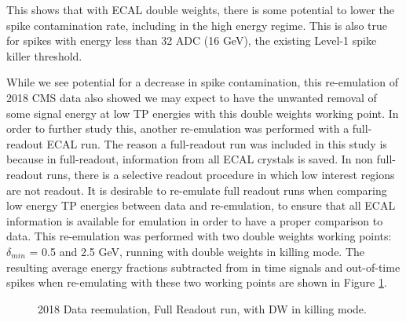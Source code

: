 This shows that with ECAL double weights, there is some potential to lower the spike contamination rate, including in the high energy regime. This is also true for spikes with energy less than 32 ADC (16 GeV), the existing Level-1 spike killer threshold. 

While we see potential for a decrease in spike contamination, this re-emulation of 2018 CMS data also showed we may expect to have the unwanted removal of some signal energy at low TP energies with this double weights working point. In order to further study this, another re-emulation was performed with a full-readout ECAL run. The reason a full-readout run was included in this study is because in full-readout, information from all ECAL crystals is saved. In non full-readout runs, there is a selective readout procedure in which low interest regions are not readout. It is desirable to re-emulate full readout runs when comparing low energy TP energies between data and re-emulation, to ensure that all ECAL information is available for emulation in order to have a proper comparison to data. This re-emulation was performed with two double weights working points: $\delta_{min}$ = 0.5 and 2.5 GeV, running with double weights in killing mode. The resulting average energy fractions subtracted from in time signals and out-of-time spikes when re-emulating with these two working points are shown in Figure \ref{fig:2018Reemulation_FR_KillingMode_deltamincompare}. 

\begin{figure}[H]%
    \setcounter{subfigure}{0}
    \centering
    \hfill
    \caption{2018 Data reemulation, Full Readout run, with DW in killing mode. \label{fig:2018Reemulation_FR_KillingMode_deltamincompare}}%
\end{figure}

